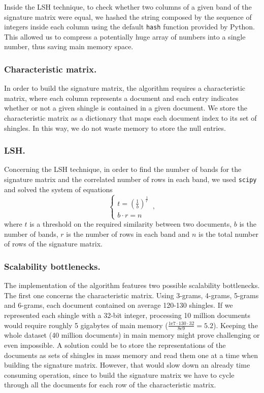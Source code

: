 \documentclass[runningheads]{llncs}
\begin{document}
Inside the LSH technique, to check whether two columns of a given band of the signature matrix were equal, we hashed the string composed by the sequence of integers inside each column using the default \texttt{hash} function provided by Python. This allowed us to compress a potentially huge array of numbers into a single number, thus saving main memory space. 

\subsubsection{Characteristic matrix.} In order to build the signature matrix, the algorithm requires a characteristic matrix, where each column represents a document and each entry indicates whether or not a given shingle is contained in a given document. We store the characteristic matrix as a dictionary that maps each document index to its set of shingles. In this way, we do not waste memory to store the null entries.

\subsubsection{LSH.} Concerning the LSH technique, in order to find the number of bands for the signature matrix and the correlated number of rows in each band, we used \texttt{scipy} and solved the system of equations
\begin{equation*}
  \begin{cases}
    t = (\frac{1}{b})^\frac{1}{r}\\
    b \cdot r = n
  \end{cases}\,,
\end{equation*}
where $t$ is a threshold on the required similarity between two documents, $b$ is the number of bands, $r$ is the number of rows in each band and $n$ is the total number of rows of the signature matrix.

\subsubsection{Scalability bottlenecks.} The implementation of the algorithm features two possible scalability bottlenecks. The first one concerns the characteristic matrix. Using 3-grams, 4-grams, 5-grams and 6-grams, each document contained on average 120-130 shingles. If we represented each shingle with a 32-bit integer, processing 10 million documents would require roughly 5 gigabytes of main memory ($\frac{1\text{e}7 \cdot 130 \cdot 32}{8\text{e}9} = 5.2$). Keeping the whole dataset (40 million documents) in main memory might prove challenging or even impossible. A solution could be to store the representations of the documents as sets of shingles in mass memory and read them one at a time when building the signature matrix. However, that would slow down an already time consuming operation, since to build the signature matrix we have to cycle through all the documents for each row of the characteristic matrix.
\end{document}
